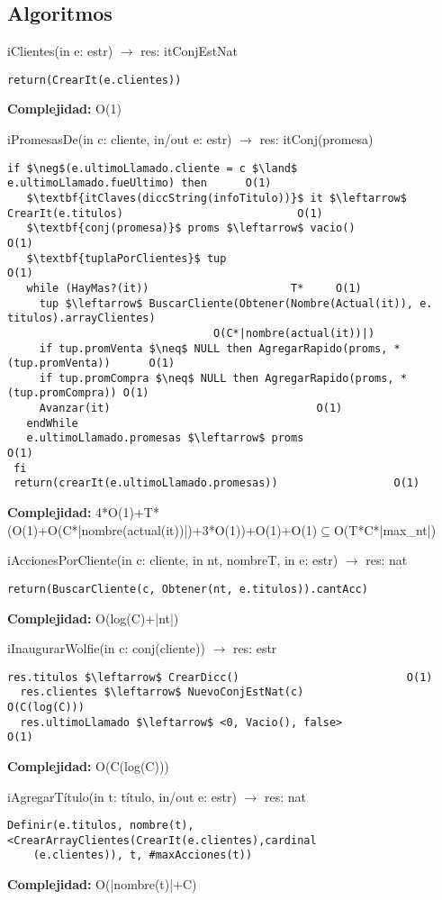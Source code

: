 \subsection{Algoritmos}
\lstset { %
    showstringspaces=false,
}
iClientes(in e: estr) $\rightarrow$ res: itConjEstNat
\begin{lstlisting}[mathescape]
  return(CrearIt(e.clientes))
\end{lstlisting}
\textbf{Complejidad:} O(1)

iPromesasDe(in c: cliente, in/out e: estr) $\rightarrow$ res: itConj(promesa)
\begin{lstlisting}[mathescape]
 if $\neg$(e.ultimoLlamado.cliente = c $\land$ e.ultimoLlamado.fueUltimo) then		O(1)
   $\textbf{itClaves(diccString(infoTitulo))}$ it $\leftarrow$ CrearIt(e.titulos)							O(1)
   $\textbf{conj(promesa)}$ proms $\leftarrow$ vacio() 								O(1)
   $\textbf{tuplaPorClientes}$ tup										O(1)
   while (HayMas?(it))						T*	   O(1)
     tup $\leftarrow$ BuscarCliente(Obtener(Nombre(Actual(it)), e. titulos).arrayClientes)	
     							O(C*|nombre(actual(it))|)
     if tup.promVenta $\neq$ NULL then AgregarRapido(proms, *(tup.promVenta))	   O(1)
     if tup.promCompra $\neq$ NULL then AgregarRapido(proms, *(tup.promCompra)) O(1)
     Avanzar(it)								O(1)
   endWhile
   e.ultimoLlamado.promesas $\leftarrow$ proms						O(1)
 fi
 return(crearIt(e.ultimoLlamado.promesas))					O(1)
\end{lstlisting}
\textbf{Complejidad:} 4*O(1)+T*(O(1)+O(C*|nombre(actual(it))|)+3*O(1))+O(1)+O(1)$\subseteq$O(T*C*|max\_nt|)

iAccionesPorCliente(in c: cliente, in nt, nombreT, in e: estr) $\rightarrow$ res: nat
\begin{lstlisting}[mathescape]
  return(BuscarCliente(c, Obtener(nt, e.titulos)).cantAcc)
\end{lstlisting}
\textbf{Complejidad:} O(log(C)+|nt|)

iInaugurarWolfie(in c: conj(cliente)) $\rightarrow$ res: estr
\begin{lstlisting}[mathescape]
  res.titulos $\leftarrow$ CrearDicc()							O(1)
  res.clientes $\leftarrow$ NuevoConjEstNat(c)					O(C(log(C)))	
  res.ultimoLlamado $\leftarrow$ <0, Vacio(), false>					O(1)
\end{lstlisting}
\textbf{Complejidad:} O(C(log(C)))

iAgregarT\'itulo(in t: t\'itulo, in/out e: estr) $\rightarrow$ res: nat
\begin{lstlisting}[mathescape]
  Definir(e.titulos, nombre(t), <CrearArrayClientes(CrearIt(e.clientes),cardinal
  	(e.clientes)), t, #maxAcciones(t))
\end{lstlisting}
\textbf{Complejidad:} O(|nombre(t)|+C)

